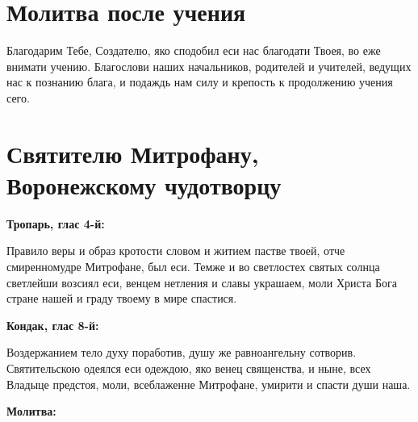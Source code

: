 \section{Молитва после учения}
 


Благодарим Тебе, Создателю, яко сподобил еси нас благодати Твоея, во еже внимати учению. Благослови наших начальников, родителей и учителей, ведущих нас к познанию блага, и подаждь нам силу и крепость к продолжению учения сего.
\mychapterending


 

\section{Святителю Митрофану, Воронежскому чудотворцу}
 
\bfseries Тропарь, глас 4-й:\normalfont{}\nopagebreak


Правило веры и образ кротости словом и житием пастве твоей, отче смиренномудре Митрофане, был еси. Темже и во светлостех святых солнца светлейши возсиял еси, венцем нетления и славы украшаем, моли Христа Бога стране нашей и граду твоему в мире спастися.

\medskip
\bfseries Кондак, глас 8-й:\normalfont{}\nopagebreak


Воздержанием тело духу поработив, душу же равноангельну сотворив. Святительскою одеялся еси одеждою, яко венец священства, и ныне, всех Владыце предстоя, моли, всеблаженне Митрофане, умирити и спасти души наша.

\medskip
\bfseries Молитва:\normalfont{}\nopagebreak


